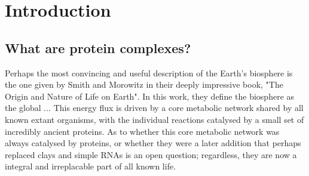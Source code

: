 \documentclass[a4paper,11pt,twoside,openright]{book}
\begin{document}
\chapter{Introduction}

\section{What are protein complexes?}
Perhaps the most convincing and useful description of the Earth's biosphere is the one given by Smith and Morowitz in their deeply impressive book, "The Origin and Nature of Life on Earth". In this work, they define the biosphere as the global ... This energy flux is driven by a core metabolic network shared by all known extant organisms, with the individual reactions catalysed by a small set of incredibly ancient proteins. As to whether this core metabolic network was always catalysed by proteins, or whether they were a later addition that perhaps replaced clays and simple RNAs is an open question; regardless, they are now a integral and irreplacable part of all known life.

\end{document}
